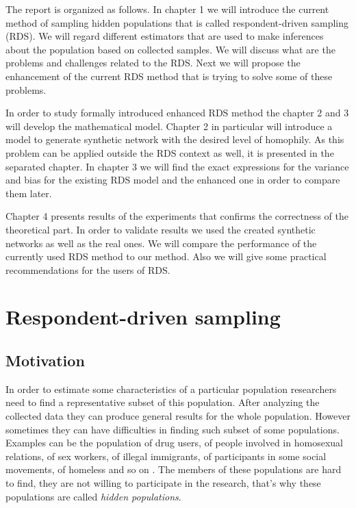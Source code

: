 \documentclass[12pt]{report}
\begin{document}
The report is organized as follows.
In chapter 1 we will introduce the current method of sampling hidden populations that is called respondent-driven sampling (RDS). We will regard different estimators that are used to make inferences about the population based on collected samples. We will discuss what are the problems and challenges related to the RDS. Next we will propose the enhancement of the current RDS method that is trying to solve some of these problems.

In order to study formally introduced enhanced RDS method the chapter 2 and 3 will develop the mathematical model. Chapter 2 in particular will introduce a model to generate synthetic network with the desired level of homophily. As this problem can be applied outside the RDS context as well, it is presented in the separated chapter.
In chapter 3 we will find the exact expressions for the variance and bias for the existing RDS model and the enhanced one in order to compare them later.

Chapter 4 presents results of the experiments that confirms the correctness of the theoretical part. In order to validate results we used the created synthetic networks as well as the real ones. We will compare the performance of the currently used RDS method to our method. Also we will give some practical recommendations for the users of RDS.



\chapter{Respondent-driven sampling}

\section{Motivation}

In order to estimate some characteristics of a particular population researchers need to find a representative subset of this population. After analyzing the collected data they can produce general results for the whole population.
However sometimes they can have difficulties in finding such subset of some populations. Examples can be the population of drug users, of people involved in homosexual relations, of sex workers, of illegal immigrants, of participants in some social movements, of homeless and so on \cite{salganik2004sampling}. The members of these populations are hard to find, they are not willing to participate in the research, that's why these populations are called \textit{hidden populations}.
\end{document}
